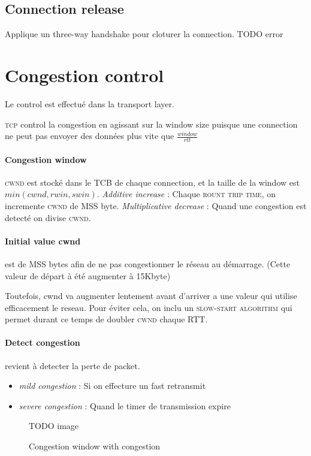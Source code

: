 \documentclass{report}
\begin{document}
\subsection{Connection release}
Applique un three-way handshake pour cloturer la connection.
TODO error

\section{Congestion control}
Le control est effectué dans la transport layer. 

\textsc{tcp} control la congestion en agissant sur la window size puisque une connection 
ne peut pas envoyer des données plus vite que $\frac{window}{rtt}$

\paragraph{Congestion window}
\textsc{cwnd} est stocké dans le \textsc{TCB} de chaque connection, et la taille de la window
est $min(cwnd, rwin, swin)$.  \textit{Additive increase} : Chaque \textsc{rount trip time}, on incremente \textsc{cwnd} de MSS byte. \textit{Multiplicative decrease} : Quand une congestion
est detecté on divise \textsc{cwnd}.

\paragraph{Initial value cwnd}
est de MSS bytes afin de ne pas congestionner le réseau au démarrage. 
(Cette valeur de départ à été augmenter à 15Kbyte)


Toutefois, cwnd va augmenter lentement avant d'arriver a une valeur qui utilise efficacement le
reseau. Pour éviter cela, on inclu un \textsc{slow-start algorithm} qui permet durant ce temps
de doubler \textsc{cwnd} chaque RTT.

\paragraph{Detect congestion} revient à detecter la perte de packet.
\begin{itemize}
    \item \textit{mild congestion} : Si on effecture un fast retransmit
    \item \textit{severe congestion} : Quand le timer de transmission expire
\end{itemize}

\begin{figure}
    TODO image
   \caption{Congestion window with congestion}
\end{figure}
\end{document}
